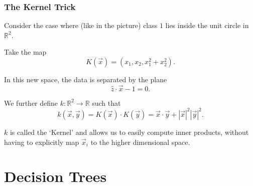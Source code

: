 \documentclass[mathserif,serif]{beamer}
\begin{document}
\begin{frame}
  \frametitle{The Kernel Trick}
  Consider the case where (like in the picture) class $1$ lies inside the unit circle in $\mathbb{R}^2$.

  \pause
  Take the map
  \begin{equation}
    K(\vec x) = (x_1, x_2, x_1^2+x_2^2).
  \end{equation}

  \pause
  In this new space, the data is separated by the plane
  \begin{equation}
    \hat z \cdot \vec x - 1 = 0.
  \end{equation}

  \pause
  We further define $k: \mathbb{R}^2 \to \mathbb{R}$ such that
  \begin{equation}
    k(\vec x, \vec y) = K(\vec x) \cdot K(\vec y) = \vec x \cdot \vec y + |\vec x|^2 |\vec y|^2.
  \end{equation}

  \pause
  $k$ is called the `Kernel' and allows us to easily compute inner products, without having to
  explicitly map $\vec x_i$ to the higher dimensional space.

\end{frame}

\section{Decision Trees}
\frame{\sectionpage}
\end{document}
